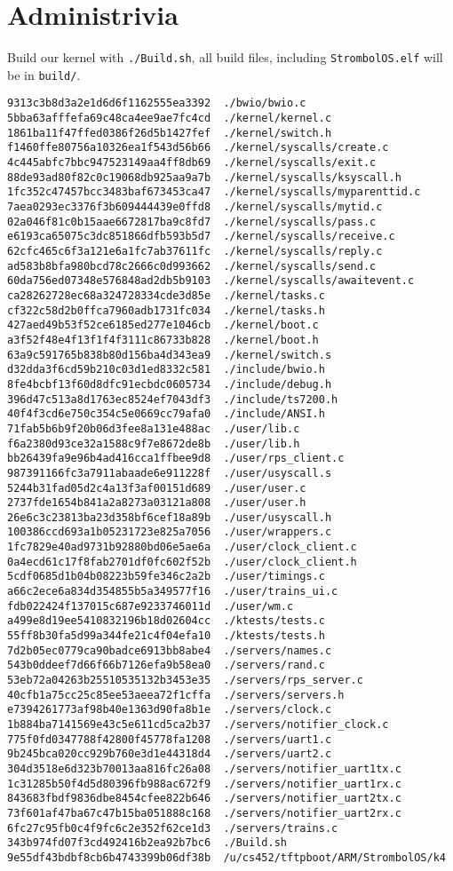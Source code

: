 \documentclass{article}
\begin{document}
\section{Administrivia}
Build our kernel with \texttt{./Build.sh}, all build files, including
\texttt{StrombolOS.elf} will be in \texttt{build/}.
\begin{verbatim}
9313c3b8d3a2e1d6d6f1162555ea3392  ./bwio/bwio.c
5bba63afffefa69c48ca4ee9ae7fc4cd  ./kernel/kernel.c
1861ba11f47ffed0386f26d5b1427fef  ./kernel/switch.h
f1460ffe80756a10326ea1f543d56b66  ./kernel/syscalls/create.c
4c445abfc7bbc947523149aa4ff8db69  ./kernel/syscalls/exit.c
88de93ad80f82c0c19068db925aa9a7b  ./kernel/syscalls/ksyscall.h
1fc352c47457bcc3483baf673453ca47  ./kernel/syscalls/myparenttid.c
7aea0293ec3376f3b609444439e0ffd8  ./kernel/syscalls/mytid.c
02a046f81c0b15aae6672817ba9c8fd7  ./kernel/syscalls/pass.c
e6193ca65075c3dc851866dfb593b5d7  ./kernel/syscalls/receive.c
62cfc465c6f3a121e6a1fc7ab37611fc  ./kernel/syscalls/reply.c
ad583b8bfa980bcd78c2666c0d993662  ./kernel/syscalls/send.c
60da756ed07348e576848ad2db5b9103  ./kernel/syscalls/awaitevent.c
ca28262728ec68a324728334cde3d85e  ./kernel/tasks.c
cf322c58d2b0ffca7960adb1731fc034  ./kernel/tasks.h
427aed49b53f52ce6185ed277e1046cb  ./kernel/boot.c
a3f52f48e4f13f1f4f3111c86733b828  ./kernel/boot.h
63a9c591765b838b80d156ba4d343ea9  ./kernel/switch.s
d32dda3f6cd59b210c03d1ed8332c581  ./include/bwio.h
8fe4bcbf13f60d8dfc91ecbdc0605734  ./include/debug.h
396d47c513a8d1763ec8524ef7043df3  ./include/ts7200.h
40f4f3cd6e750c354c5e0669cc79afa0  ./include/ANSI.h
71fab5b6b9f20b06d3fee8a131e488ac  ./user/lib.c
f6a2380d93ce32a1588c9f7e8672de8b  ./user/lib.h
bb26439fa9e96b4ad416cca1ffbee9d8  ./user/rps_client.c
987391166fc3a7911abaade6e911228f  ./user/usyscall.s
5244b31fad05d2c4a13f3af00151d689  ./user/user.c
2737fde1654b841a2a8273a03121a808  ./user/user.h
26e6c3c23813ba23d358bf6cef18a89b  ./user/usyscall.h
100386ccd693a1b05231723e825a7056  ./user/wrappers.c
1fc7829e40ad9731b92880bd06e5ae6a  ./user/clock_client.c
0a4ecd61c17f8fab2701df0fc602f52b  ./user/clock_client.h
5cdf0685d1b04b08223b59fe346c2a2b  ./user/timings.c
a66c2ece6a834d354855b5a349577f16  ./user/trains_ui.c
fdb022424f137015c687e9233746011d  ./user/wm.c
a499e8d19ee5410832196b18d02604cc  ./ktests/tests.c
55ff8b30fa5d99a344fe21c4f04efa10  ./ktests/tests.h
7d2b05ec0779ca90badce6913bb8abe4  ./servers/names.c
543b0ddeef7d66f66b7126efa9b58ea0  ./servers/rand.c
53eb72a04263b25510535132b3453e35  ./servers/rps_server.c
40cfb1a75cc25c85ee53aeea72f1cffa  ./servers/servers.h
e7394261773af98b40e1363d90fa8b1e  ./servers/clock.c
1b884ba7141569e43c5e611cd5ca2b37  ./servers/notifier_clock.c
775f0fd0347788f42800f45778fa1208  ./servers/uart1.c
9b245bca020cc929b760e3d1e44318d4  ./servers/uart2.c
304d3518e6d323b70013aa816fc26a08  ./servers/notifier_uart1tx.c
1c31285b50f4d5d80396fb988ac672f9  ./servers/notifier_uart1rx.c
843683fbdf9836dbe8454cfee822b646  ./servers/notifier_uart2tx.c
73f601af47ba67c47b15ba051888c168  ./servers/notifier_uart2rx.c
6fc27c95fb0c4f9fc6c2e352f62ce1d3  ./servers/trains.c
343b974fd07f3cd492416b2ea92b7bc6  ./Build.sh
9e55df43bdbf8cb6b4743399b06df38b  /u/cs452/tftpboot/ARM/StrombolOS/k4
\end{verbatim}
\end{document}
